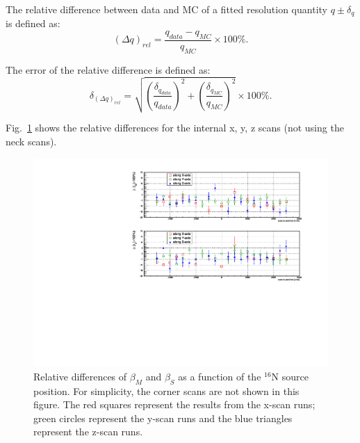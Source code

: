 The relative difference between data and MC of a fitted resolution quantity $q\pm \delta_q$ is defined as:
\begin{equation}
(\Delta q)_{rel} = \frac{q_{data}-q_{MC}}{q_{MC}}\times 100\%.
\end{equation}

The error of the relative difference is defined as: 
\begin{equation}
\delta_{(\Delta q)_{rel}} = \sqrt{(\frac{\delta_{q_{data}}}{q_{data}})^2+(\frac{\delta_{q_{MC}}}{q_{MC}})^2}\times 100\%.
\end{equation}\label{eq:erors_relativeBiases}

Fig.~\ref{relative_biasesVsPositions} shows the relative differences for the internal x, y, z scans (not using the neck scans).
\begin{figure}[!htb]
	\centering
	\includegraphics[width=16cm]{angularResol_scanXYZ.pdf}
	\caption{Relative differences of $\beta_M$ and $\beta_S$ as a function of the $^{16}$N source position. For simplicity, the corner scans are not shown in this figure. The red squares represent the results from the x-scan runs; green circles represent the y-scan runs and the blue triangles represent the z-scan runs.}
	\label{relative_biasesVsPositions}
\end{figure}

